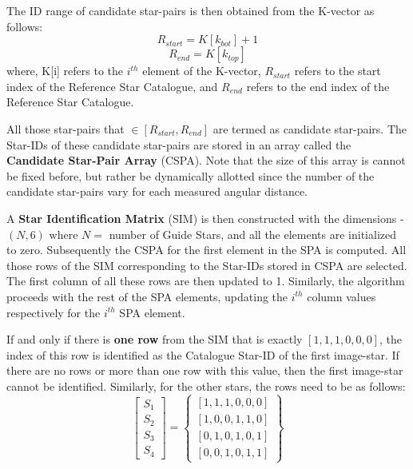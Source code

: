 \documentclass[../../main.tex]{subfiles}
\begin{document}
The ID range of candidate star-pairs is then obtained from the K-vector as follows:
\begin{equation}
    R_{start} = K[k_{bot}] + 1
\end{equation}
\begin{equation}
    R_{end} = K[k_{top}]
\end{equation}
where, K[i] refers to the $i^{th}$ element of the K-vector, $R_{start}$ refers to the start index of the Reference Star Catalogue, and $R_{end}$ refers to the end index of the Reference Star Catalogue.

All those star-pairs that $\in [R_{start}, R_{end}]$ are termed as candidate star-pairs. The Star-IDs of these candidate star-pairs are stored in an array called the \textbf{Candidate Star-Pair Array} (CSPA). Note that the size of this array is cannot be fixed before, but rather be dynamically allotted since the number of the candidate star-pairs vary for each measured angular distance.

A \textbf{Star Identification Matrix} (SIM) is then constructed with the dimensions - $(N, 6)$ where $N = $ number of Guide Stars, and all the elements are initialized to zero. 
Subsequently the CSPA for the first element in the SPA is computed. All those rows of the SIM corresponding to the Star-IDs stored in CSPA are selected. The first column of all these rows are then updated to 1.
Similarly, the algorithm proceeds with the rest of the SPA elements, updating the $i^{th}$ column values respectively for the $i^{th}$ SPA element.

If and only if there is \textbf{one row} from the SIM that is exactly $[1,1,1,0,0,0]$, the index of this row is identified as the Catalogue Star-ID of the first image-star.
If there are no rows or more than one row with this value, then the first image-star cannot be identified. Similarly, for the other stars, the rows need to be as follows:
\begin{equation}
    \begin{bmatrix} S_1 \\ S_2 \\ S_3 \\ S_4\end{bmatrix} = \begin{Bmatrix} [1,1,1,0,0,0] \\ [1,0,0,1,1,0] \\ [0,1,0,1,0,1] \\ [0,0,1,0,1,1] \end{Bmatrix}
\end{equation}
\end{document}

